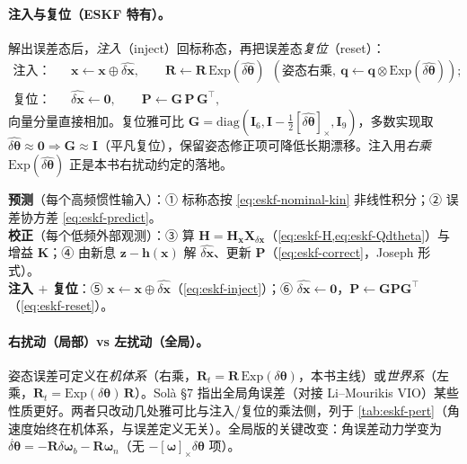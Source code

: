 \paragraph{注入与复位（ESKF 特有）。}
解出误差态后，\emph{注入}（inject）回标称态，再把误差态\emph{复位}（reset）：
\begin{align}
  \text{注入：}\quad
  &\mathbf{x}\leftarrow\mathbf{x}\oplus\widehat{\delta\mathbf{x}},\qquad
  \mathbf{R}\leftarrow\mathbf{R}\,\mathrm{Exp}(\widehat{\delta\boldsymbol{\theta}})\ \ (\text{姿态右乘},\ \mathbf{q}\leftarrow\mathbf{q}\otimes\mathrm{Exp}(\widehat{\delta\boldsymbol{\theta}})); \label{eq:eskf-inject}\\
  \text{复位：}\quad
  &\widehat{\delta\mathbf{x}}\leftarrow\mathbf{0},\qquad
  \mathbf{P}\leftarrow\mathbf{G}\,\mathbf{P}\,\mathbf{G}^\top, \label{eq:eskf-reset}
\end{align}
向量分量直接相加。复位雅可比 $\mathbf{G}=\mathrm{diag}(\mathbf{I}_6,\mathbf{I}-\tfrac12[\widehat{\delta\boldsymbol{\theta}}]_\times,\mathbf{I}_9)$，多数实现取 $\widehat{\delta\boldsymbol{\theta}}\approx\mathbf{0}\Rightarrow\mathbf{G}\approx\mathbf{I}$（平凡复位），保留姿态修正项可降低长期漂移\cite{sola2017quaternion}。注入用\emph{右乘} $\mathrm{Exp}(\widehat{\delta\boldsymbol{\theta}})$ 正是本书右扰动约定的落地。

\begin{algo}\label{algo:eskf}
\textbf{预测}（每个高频惯性输入）：① 标称态按 \cref{eq:eskf-nominal-kin} 非线性积分；② 误差协方差 \cref{eq:eskf-predict}。\\
\textbf{校正}（每个低频外部观测）：③ 算 $\mathbf{H}=\mathbf{H}_{\mathbf{x}}\mathbf{X}_{\delta\mathbf{x}}$（\cref{eq:eskf-H,eq:eskf-Qdtheta}）与增益 $\mathbf{K}$；④ 由新息 $\mathbf{z}-\mathbf{h}(\mathbf{x})$ 解 $\widehat{\delta\mathbf{x}}$、更新 $\mathbf{P}$（\cref{eq:eskf-correct}，Joseph 形式）。\\
\textbf{注入 $+$ 复位}：⑤ $\mathbf{x}\leftarrow\mathbf{x}\oplus\widehat{\delta\mathbf{x}}$（\cref{eq:eskf-inject}）；⑥ $\widehat{\delta\mathbf{x}}\leftarrow\mathbf{0}$，$\mathbf{P}\leftarrow\mathbf{G}\mathbf{P}\mathbf{G}^\top$（\cref{eq:eskf-reset}）。
\end{algo}

\paragraph{右扰动（局部）vs 左扰动（全局）。}
姿态误差可定义在\emph{机体系}（右乘，$\mathbf{R}_t=\mathbf{R}\,\mathrm{Exp}(\delta\boldsymbol{\theta})$，本书主线）或\emph{世界系}（左乘，$\mathbf{R}_t=\mathrm{Exp}(\delta\boldsymbol{\theta})\,\mathbf{R}$）。Solà\cite{sola2017quaternion} §7 指出全局角误差（对接 Li–Mourikis VIO）某些性质更好。两者只改动几处雅可比与注入/复位的乘法侧，列于 \cref{tab:eskf-pert}（角速度始终在机体系，与误差定义无关）。全局版的关键改变：角误差动力学变为 $\dot{\delta\boldsymbol{\theta}}=-\mathbf{R}\delta\boldsymbol{\omega}_b-\mathbf{R}\boldsymbol{\omega}_n$（无 $-[\boldsymbol{\omega}]_\times\delta\boldsymbol{\theta}$ 项）。

